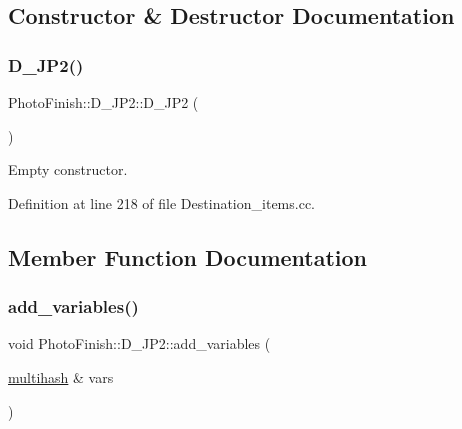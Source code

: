 \subsection{Constructor \& Destructor Documentation}
\mbox{\label{class_photo_finish_1_1_d___j_p2_a6d72a9eb9393447c707eb80e7fe2a834}} 
\subsubsection{\texorpdfstring{D\+\_\+\+J\+P2()}{D\_JP2()}}
{\footnotesize\ttfamily Photo\+Finish\+::\+D\+\_\+\+J\+P2\+::\+D\+\_\+\+J\+P2 (\begin{DoxyParamCaption}{ }\end{DoxyParamCaption})}



Empty constructor. 



Definition at line 218 of file Destination\+\_\+items.\+cc.



\subsection{Member Function Documentation}
\mbox{\label{class_photo_finish_1_1_d___j_p2_a193a8087221647734efb84f5642af9c5}} 
\subsubsection{\texorpdfstring{add\+\_\+variables()}{add\_variables()}}
{\footnotesize\ttfamily void Photo\+Finish\+::\+D\+\_\+\+J\+P2\+::add\+\_\+variables (\begin{DoxyParamCaption}\item[{\hyperlink{namespace_photo_finish_a6f41796f162687538b7da5c7a95e2d18}{multihash} \&}]{vars }\end{DoxyParamCaption})}



